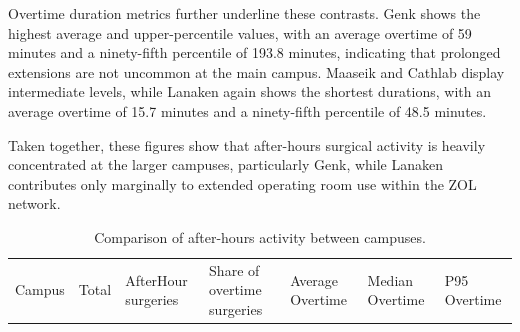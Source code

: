 \documentclass[
]{article}
\begin{document}
Overtime duration metrics further underline these contrasts. Genk shows
the highest average and upper-percentile values, with an average
overtime of 59 minutes and a ninety-fifth percentile of 193.8 minutes,
indicating that prolonged extensions are not uncommon at the main
campus. Maaseik and Cathlab display intermediate levels, while Lanaken
again shows the shortest durations, with an average overtime of 15.7
minutes and a ninety-fifth percentile of 48.5 minutes.

Taken together, these figures show that after-hours surgical activity is
heavily concentrated at the larger campuses, particularly Genk, while
Lanaken contributes only marginally to extended operating room use
within the ZOL network.

\begin{longtable}[]{@{}
  >{\centering\arraybackslash}p{}
  >{\centering\arraybackslash}p{}
  >{\centering\arraybackslash}p{}
  >{\centering\arraybackslash}p{}
  >{\centering\arraybackslash}p{}
  >{\centering\arraybackslash}p{}
  >{\centering\arraybackslash}p{}@{}}
\caption{Comparison of after-hours activity between campuses.
\label{tab:afterhours_campus}}\tabularnewline
\toprule\noalign{}
\begin{minipage}[b]{\linewidth}\centering
Campus
\end{minipage} & \begin{minipage}[b]{\linewidth}\centering
Total
\end{minipage} & \begin{minipage}[b]{\linewidth}\centering
AfterHour surgeries
\end{minipage} & \begin{minipage}[b]{\linewidth}\centering
Share of overtime surgeries
\end{minipage} & \begin{minipage}[b]{\linewidth}\centering
Average Overtime
\end{minipage} & \begin{minipage}[b]{\linewidth}\centering
Median Overtime
\end{minipage} & \begin{minipage}[b]{\linewidth}\centering
P95 Overtime
\end{minipage} \\

\end{longtable}
\end{document}
